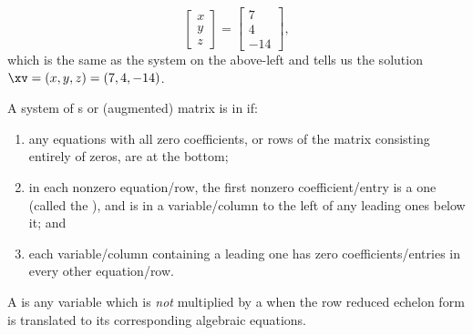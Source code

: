 \begin{example}
\begin{solution}
\begin{equation*}
\begin{bmatrix} x\\y\\z \end{bmatrix}
=\begin{bmatrix} 7\\4\\-14 \end{bmatrix},
\end{equation*}
which is the same as the system on the above-left and tells us the solution \(\xv=(x,y,z)=(7,4,-14)\).
\end{solution}
\end{example}





\begin{definition} \label{def:rref} 
  A system of s or (augmented) matrix is in  if:
  \begin{enumerate}
\item any equations with all zero coefficients, or rows of the matrix consisting entirely of zeros, are at the bottom; 
\item in each nonzero equation\slash row, the first nonzero coefficient\slash entry is a one (called the ), and is in a variable\slash column to the left of any leading ones below it;
and
\item each variable\slash column containing a leading one has zero coefficients\slash entries in every other equation\slash row.\end{enumerate}
A  is any variable which is \emph{not} multiplied by a  when the row reduced echelon form is translated to its corresponding algebraic equations.
\end{definition}


